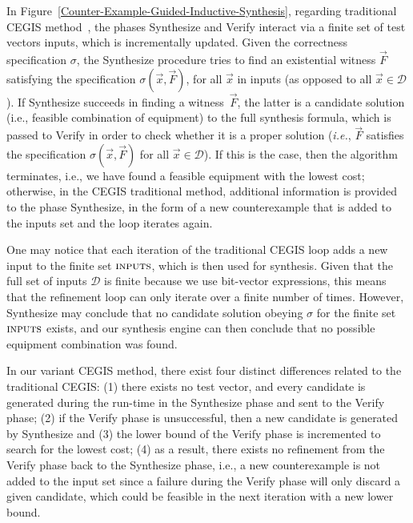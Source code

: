 \documentclass[journal]{IEEEtran}
\begin{document}
In Figure~\ref{Counter-Example-Guided-Inductive-Synthesis}, regarding traditional CEGIS method~\cite{AbateCAV2018}, the phases {\sc Synthesize} and {\sc Verify} interact via a finite set of test vectors {\sc inputs}, which is incrementally updated. Given the correctness specification $\sigma$, the {\sc Synthesize} procedure tries to find an existential witness $\vec{F}$ satisfying the specification $\sigma(\vec{x}, \vec{F})$, for all $\vec{x}$ in {\sc inputs} (as opposed to all $\vec{x} \in \mathcal{D}$). If {\sc Synthesize} succeeds in finding a witness~$\vec{F}$, the latter is a candidate solution (i.e., feasible combination of equipment) to the full synthesis formula, which is passed to {\sc Verify} in order to check whether it is a proper solution ({\it i.e.}, $\vec{F}$ satisfies the specification $\sigma(\vec{x}, \vec{F})$ for all $\vec{x}\in\mathcal{D}$). If this is the case, then the algorithm terminates, i.e., we have found a feasible equipment with the lowest cost; otherwise, in the CEGIS traditional method, additional information is provided to the phase {\sc Synthesize}, in the form of a new counterexample that is added to the {\sc inputs} set and the loop iterates again.

One may notice that each iteration of the traditional CEGIS loop adds a new input to the finite set $\text{\sc inputs}$, which is then used for synthesis. Given that the full set of inputs $\mathcal{D}$ is finite because we use bit-vector expressions, this means that the refinement loop can only iterate over a finite number of times. However, {\sc Synthesize} may conclude that no candidate solution obeying $\sigma$ for the finite set $\text{\sc inputs}$ exists, and our synthesis engine can then conclude that no possible equipment combination was found.

In our variant CEGIS method, there exist four distinct differences related to the traditional CEGIS: 
(1) there exists no test vector, and every candidate is generated during the run-time in the {\sc Synthesize} phase and sent to the {\sc Verify} phase; 
(2) if the {\sc Verify} phase is unsuccessful, then a new candidate is generated by {\sc Synthesize} and 
(3) the lower bound of the {\sc Verify} phase is incremented to search for the lowest cost; 
(4) as a result, there exists no refinement from the {\sc Verify} phase back to the {\sc Synthesize} phase, i.e., 
a new counterexample is not added to the {\sc input} set since a failure during the {\sc Verify} phase will only discard a given candidate, which could be feasible in the next iteration with a new lower bound.
\end{document}
